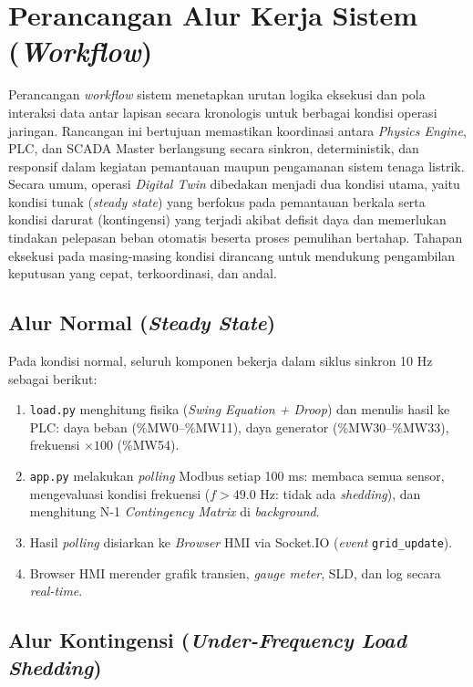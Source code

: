 \section{Perancangan Alur Kerja Sistem (\textit{Workflow})}
\label{sec:Alur_Kerja}

Perancangan \textit{workflow} sistem menetapkan urutan logika eksekusi dan pola interaksi data antar lapisan secara kronologis untuk berbagai kondisi operasi jaringan. Rancangan ini bertujuan memastikan koordinasi antara \textit{Physics Engine}, PLC, dan SCADA Master berlangsung secara sinkron, deterministik, dan responsif dalam kegiatan pemantauan maupun pengamanan sistem tenaga listrik. Secara umum, operasi \textit{Digital Twin} dibedakan menjadi dua kondisi utama, yaitu kondisi tunak (\textit{steady state}) yang berfokus pada pemantauan berkala serta kondisi darurat (kontingensi) yang terjadi akibat defisit daya dan memerlukan tindakan pelepasan beban otomatis beserta proses pemulihan bertahap. Tahapan eksekusi pada masing-masing kondisi dirancang untuk mendukung pengambilan keputusan yang cepat, terkoordinasi, dan andal.

\subsection{Alur Normal (\textit{Steady State})}

Pada kondisi normal, seluruh komponen bekerja dalam siklus sinkron 10 Hz sebagai berikut:
\begin{enumerate}
    \item \texttt{load.py} menghitung fisika (\textit{Swing Equation + Droop}) dan menulis hasil ke PLC: daya beban (\%MW0--\%MW11), daya generator (\%MW30--\%MW33), frekuensi $\times 100$ (\%MW54).
    \item \texttt{app.py} melakukan \textit{polling} Modbus setiap 100 ms: membaca semua sensor, mengevaluasi kondisi frekuensi ($f > 49{.}0$ Hz: tidak ada \textit{shedding}), dan menghitung N-1 \textit{Contingency Matrix} di \textit{background}.
    \item Hasil \textit{polling} disiarkan ke \textit{Browser} HMI via Socket.IO (\textit{event} \texttt{grid\_update}).
    \item Browser HMI merender grafik transien, \textit{gauge meter}, SLD, dan log secara \textit{real-time}.
\end{enumerate}

\subsection{Alur Kontingensi (\textit{Under-Frequency Load Shedding})}

